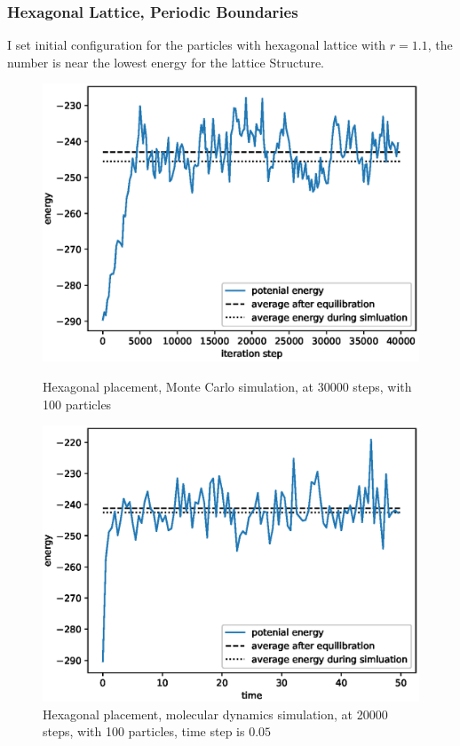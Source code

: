 \documentclass[UTF8,a4paper,no-math]{article}
\begin{document}
\subsubsection{Hexagonal Lattice, Periodic Boundaries}
I set initial configuration for the particles with hexagonal lattice with $r = 1.1$, the number is near the lowest energy for the lattice Structure.
\begin{figure}[H]
	\centering
	\begin{minipage}[t]{0.45\textwidth}
		\centering
		\includegraphics[height=0.2\textheight]{fig/plot_40000_steps_100_particles_0.8442_rho_0.728_tempure_1.eps}
		\caption{Hexagonal placement, Monte Carlo simulation, at 30000 steps, with 100 particles}
	\end{minipage}\hspace{0.5cm}
	\begin{minipage}[t]{0.45\textwidth}
		\centering
		\includegraphics[height=0.2\textheight]{fig/md_plot_norand__10000_steps_100_particles_0.8442_rho_0.728_tempure_.eps}
		\caption{Hexagonal placement, molecular dynamics simulation, at 20000 steps, with 100 particles, time step is $0.05$}
	\end{minipage}
\end{figure}
\end{document}
